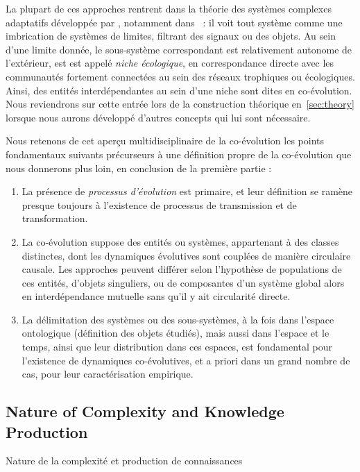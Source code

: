 La plupart de ces approches rentrent dans la théorie des systèmes complexes adaptatifs développée par , notamment dans~\cite{holland2012signals} : il voit tout système comme une imbrication de systèmes de limites, filtrant des signaux ou des objets. Au sein d'une limite donnée, le sous-système correspondant est relativement autonome de l'extérieur, est est appelé \emph{niche écologique}, en correspondance directe avec les communautés fortement connectées au sein des réseaux trophiques ou écologiques. Ainsi, des entités interdépendantes au sein d'une niche sont dites en co-évolution. Nous reviendrons sur cette entrée lors de la construction théorique en~\ref{sec:theory} lorsque nous aurons développé d'autres concepts qui lui sont nécessaire.


Nous retenons de cet aperçu multidisciplinaire de la co-évolution les points fondamentaux suivants précurseurs à une définition propre de la co-évolution que nous donnerons plus loin, en conclusion de la première partie :

\begin{enumerate}
	\item La présence de \emph{processus d'évolution} est primaire, et leur définition se ramène presque toujours à l'existence de processus de transmission et de transformation.
	\item La co-évolution suppose des entités ou systèmes, appartenant à des classes distinctes, dont les dynamiques évolutives sont couplées de manière circulaire causale. Les approches peuvent différer selon l'hypothèse de populations de ces entités, d'objets singuliers, ou de composantes d'un système global alors en interdépendance mutuelle sans qu'il y ait circularité directe. %
	\item La délimitation des systèmes ou des sous-systèmes, à la fois dans l'espace ontologique (définition des objets étudiés), mais aussi dans l'espace et le temps, ainsi que leur distribution dans ces espaces, est fondamental pour l'existence de dynamiques co-évolutives, et a priori dans un grand nombre de cas, pour leur caractérisation empirique.
\end{enumerate}





\subsection{Nature of Complexity and Knowledge Production}{Nature de la complexité et production de connaissances}


